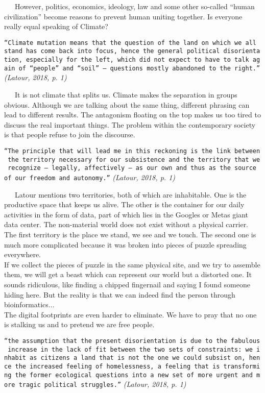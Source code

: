 \documentclass[
]{article}
\begin{document}
~~~However, politics, economics, ideology, law and some other so-called
``human civilization'' become reasons to prevent human uniting together.
Is everyone really equal speaking of Climate?

\texttt{“Climate\ mutation\ means\ that\ the\ question\ of\ the\ land\ on\ which\ we\ all\ stand\ has\ come\ back\ into\ focus,\ hence\ the\ general\ political\ disorientation,\ especially\ for\ the\ left,\ which\ did\ not\ expect\ to\ have\ to\ talk\ again\ of\ “people”\ and\ “soil”\ —\ questions\ mostly\ abandoned\ to\ the\ right.”}
\emph{(Latour, 2018, p. 1)}

~~~It is not climate that splits us. Climate makes the separation in
groups obvious. Although we are talking about the same thing, different
phrasing can lead to different results. The antagonism floating on the
top makes us too tired to discuss the real important things. The problem
within the contemporary society is that people refuse to join the
discourse.

\texttt{“The\ principle\ that\ will\ lead\ me\ in\ this\ reckoning\ is\ the\ link\ between\ the\ territory\ necessary\ for\ our\ subsistence\ and\ the\ territory\ that\ we\ recognize\ —\ legally,\ affectively\ —\ as\ our\ own\ and\ thus\ as\ the\ source\ of\ our\ freedom\ and\ autonomy.”}
\emph{(Latour, 2018, p. 1)}

~~~Latour mentions two territories, both of which are inhabitable. One
is the productive space that keeps us alive. The other is the container
for our daily activities in the form of data, part of which lies in the
Google\textquotesingle s or Meta\textquotesingle s giant data center.
The non-material world does not exist without a physical carrier. The
first territory is the place we stand, we see and we touch. The second
one is much more complicated because it was broken into pieces of puzzle
spreading everywhere.\\
If we collect the pieces of puzzle in the same physical site, and we try
to assemble them, we will get a beast which can represent our world but
a distorted one. It sounds ridiculous, like finding a chipped fingernail
and saying I found someone hiding here. But the reality is that we can
indeed find the person through bioinformatics...\\
The digital footprints are even harder to eliminate. We have to pray
that no one is stalking us and to pretend we are free people.

\texttt{“the\ assumption\ that\ the\ present\ disorientation\ is\ due\ to\ the\ fabulous\ increase\ in\ the\ lack\ of\ fit\ between\ the\ two\ sets\ of\ constraints:\ we\ inhabit\ as\ citizens\ a\ land\ that\ is\ not\ the\ one\ we\ could\ subsist\ on,\ hence\ the\ increased\ feeling\ of\ homelessness,\ a\ feeling\ that\ is\ transforming\ the\ former\ ecological\ questions\ into\ a\ new\ set\ of\ more\ urgent\ and\ more\ tragic\ political\ struggles.”}
\emph{(Latour, 2018, p. 1)}
\end{document}
